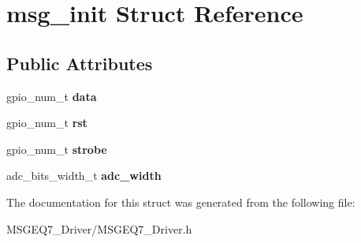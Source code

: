 \hypertarget{structmsg__init}{}\section{msg\+\_\+init Struct Reference}
\label{structmsg__init}
\subsection*{Public Attributes}
\begin{DoxyCompactItemize}
\item 
\mbox{\label{structmsg__init_a8269e8997a7a9049f08b8c30b64527bf}} 
gpio\+\_\+num\+\_\+t {\bfseries data}
\item 
\mbox{\label{structmsg__init_a74b3ce974e8bdeccc0c3e6ab0f20496b}} 
gpio\+\_\+num\+\_\+t {\bfseries rst}
\item 
\mbox{\label{structmsg__init_ab5fb9c86ad07f955541eaa8fb4edd852}} 
gpio\+\_\+num\+\_\+t {\bfseries strobe}
\item 
\mbox{\label{structmsg__init_a75c28e82034b4181d88d9e22d4df798e}} 
adc\+\_\+bits\+\_\+width\+\_\+t {\bfseries adc\+\_\+width}
\end{DoxyCompactItemize}


The documentation for this struct was generated from the following file\+:\begin{DoxyCompactItemize}
\item 
M\+S\+G\+E\+Q7\+\_\+\+Driver/M\+S\+G\+E\+Q7\+\_\+\+Driver.\+h\end{DoxyCompactItemize}
